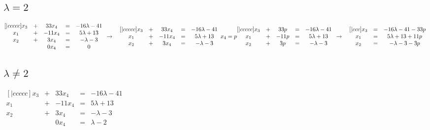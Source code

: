 \documentclass{article}
\begin{document}
    \subsection{\(\lambda = 2\)}
    \begin{math}
       \begin{matrix}[|ccccc]
            x_3 & + & 33x_4 & = & -16\lambda - 41\\
            x_1 & + & -11x_4 & = & 5\lambda + 13\\
            x_2 & + & 3x_4 & = & -\lambda - 3\\
            ~ & ~ & 0x_4 & = & 0\\
        \end{matrix}\\
        \\
        \\
        \to\quad
        \begin{matrix}[|ccccc]
            x_3 & + & 33x_4 & = & -16\lambda - 41\\
            x_1 & + & -11x_4 & = & 5\lambda + 13\\
            x_2 & + & 3x_4 & = & -\lambda - 3\\
        \end{matrix}\\
        \\
        x_4 = p\\
        \\
        \begin{matrix}[|ccccc]
            x_3 & + & 33p & = & -16\lambda - 41\\
            x_1 & + & -11p & = & 5\lambda + 13\\
            x_2 & + & 3p & = & -\lambda - 3\\
        \end{matrix}\\
        \\
        \\
        \to\quad
        \begin{matrix}[|ccc]
            x_3 & = & -16\lambda - 41 - 33p\\
            x_1 & = & 5\lambda + 13 + 11p\\
            x_2 & = & -\lambda - 3 - 3p\\
        \end{matrix}
    \end{math}
    \subsection{\(\lambda \neq 2\)}
    \begin{math}
       \begin{matrix}[|ccccc]
            x_3 & + & 33x_4 & = & -16\lambda - 41\\
            x_1 & + & -11x_4 & = & 5\lambda + 13\\
            x_2 & + & 3x_4 & = & -\lambda - 3\\
            ~ & ~ & 0x_4 & = & \lambda - 2\\
        \end{matrix}
    \end{math}
\end{document}
